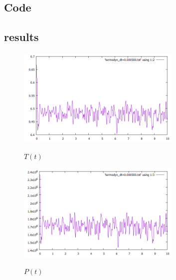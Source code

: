 \documentclass[12pt,a4paper]{article}	%
\begin{document}
\subsection{Code}

%

%

\newpage
\subsection{results}




\begin{figure}[h!]	
\centering
{\includegraphics[width=0.7\textwidth]{T(t).png}}		
\caption{$T(t)$}
\end{figure}

\begin{figure}[h!]	
\centering
{\includegraphics[width=0.7\textwidth]{P(t).png}}		
\caption{$P(t)$}
\end{figure}
\end{document}
